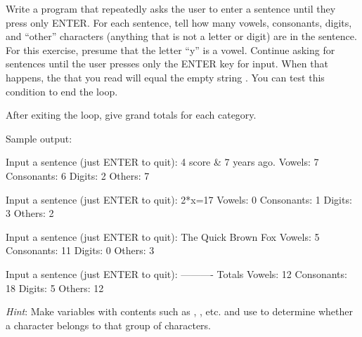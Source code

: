 \begin{exercise}
Write a program that repeatedly asks the user to enter a sentence until they press only ENTER. For each sentence, tell how many vowels, consonants, digits, and ``other'' characters (anything that is not a letter or digit) are in the sentence.  For this exercise, presume that the letter ``y'' is a vowel. Continue asking for sentences until the user presses only the ENTER key for input. When that happens, the  that you read will equal the empty string . You can test this condition to end the loop.

After exiting the loop, give grand totals for each category.

Sample output:

\begin{stdout}
Input a sentence (just ENTER to quit): 4 score & 7 years ago.
Vowels:   7  Consonants:  6
Digits:   2  Others:      7

Input a sentence (just ENTER to quit): 2*x=17
Vowels:   0  Consonants:  1
Digits:   3  Others:      2

Input a sentence (just ENTER to quit): The Quick Brown Fox
Vowels:   5  Consonants: 11
Digits:   0  Others:      3

Input a sentence (just ENTER to quit):
----------
Totals
Vowels:  12  Consonants: 18
Digits:   5  Others:     12
\end{stdout}

{\em Hint}: Make  variables with contents such as , , etc. and use  to determine whether a character belongs to that group of characters.

\end{exercise}

